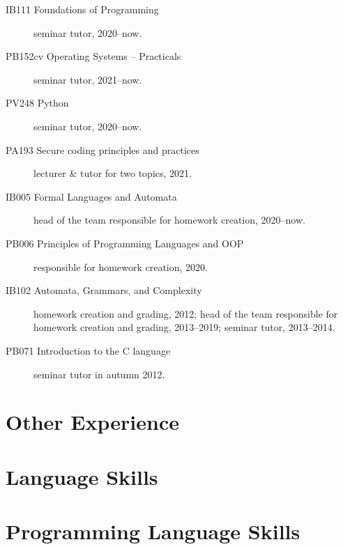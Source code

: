 \documentclass[11pt,a4paper,roman]{moderncv}        %
\begin{document}
\begin{description}
		\item[IB111 Foundations of Programming] seminar tutor, 2020--now.

		\item[PB152cv Operating Systems – Practicals] seminar tutor, 2021--now.

		\item[PV248 Python] seminar tutor, 2020--now.

		\item[PA193 Secure coding principles and practices] lecturer \& tutor for two topics, 2021.


        \item[IB005 Formal Languages and Automata] head of the team responsible for homework creation, 2020--now.

		\item[PB006 Principles of Programming Languages and OOP] responsible for homework creation, 2020.


        \item[IB102 Automata, Grammars, and Complexity] homework creation and grading, 2012; head of the team responsible for homework creation and grading, 2013--2019; seminar tutor, 2013--2014.

        \item[PB071 Introduction to the C language] seminar tutor in autumn 2012.
    \end{description}
    \endgroup

\section{Other Experience}


\section{Language Skills}


\section{Programming Language Skills}


\nocite{*}
\printbibliography[title={Publications}]
\end{document}
